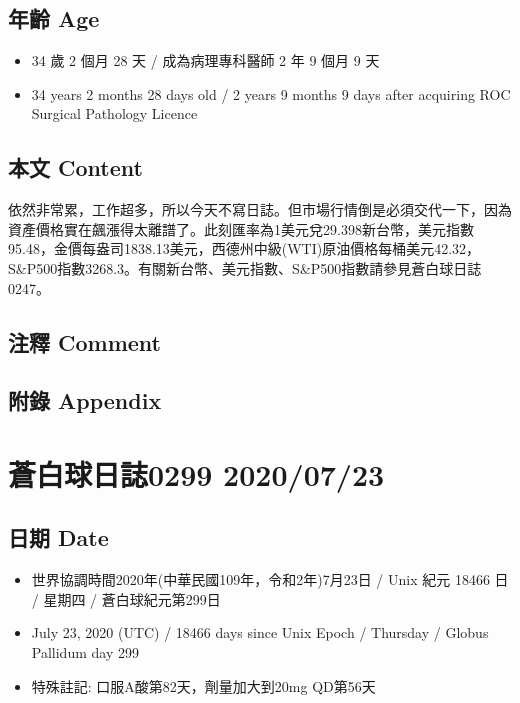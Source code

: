 \documentclass[
]{article}
\providecommand{\tightlist}{%
  \setlength{\itemsep}{0pt}\setlength{\parskip}{0pt}}
\begin{document}
\hypertarget{ux5e74ux9f61-age-19}{%
\subsection{年齡 Age}\label{ux5e74ux9f61-age-19}}

\begin{itemize}
\tightlist
\item
  34 歲 2 個月 28 天 / 成為病理專科醫師 2 年 9 個月 9 天
\item
  34 years 2 months 28 days old / 2 years 9 months 9 days after
  acquiring ROC Surgical Pathology Licence
\end{itemize}

\hypertarget{ux672cux6587-content-19}{%
\subsection{本文 Content}\label{ux672cux6587-content-19}}

依然非常累，工作超多，所以今天不寫日誌。但市場行情倒是必須交代一下，因為資產價格實在飆漲得太離譜了。此刻匯率為1美元兌29.398新台幣，美元指數95.48，金價每盎司1838.13美元，西德州中級(WTI)原油價格每桶美元42.32，S\&P500指數3268.3。有關新台幣、美元指數、S\&P500指數請參見蒼白球日誌0247。

\hypertarget{ux6ce8ux91cb-comment-19}{%
\subsection{注釋 Comment}\label{ux6ce8ux91cb-comment-19}}

\hypertarget{ux9644ux9304-appendix-19}{%
\subsection{附錄 Appendix}\label{ux9644ux9304-appendix-19}}

\hypertarget{ux84bcux767dux7403ux65e5ux8a8c0299-20200723}{%
\section{蒼白球日誌0299
2020/07/23}\label{ux84bcux767dux7403ux65e5ux8a8c0299-20200723}}

\hypertarget{ux65e5ux671f-date-20}{%
\subsection{日期 Date}\label{ux65e5ux671f-date-20}}

\begin{itemize}
\tightlist
\item
  世界協調時間2020年(中華民國109年，令和2年)7月23日 / Unix 紀元 18466 日
  / 星期四 / 蒼白球紀元第299日
\item
  July 23, 2020 (UTC) / 18466 days since Unix Epoch / Thursday / Globus
  Pallidum day 299
\item
  特殊註記: 口服A酸第82天，劑量加大到20mg QD第56天
\end{itemize}
\end{document}
